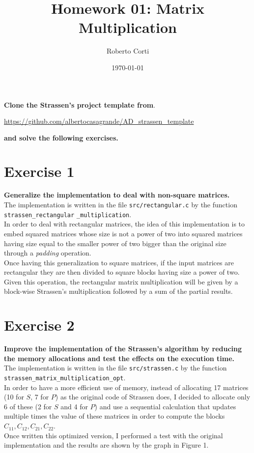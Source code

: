 \documentclass{article}
\title{Homework 01: Matrix Multiplication}
\date{\today}
\author{Roberto Corti}
\begin{document}
	\maketitle
	
	
	\noindent \textbf{Clone the Strassen’s project template from}. 
	\begin{center}
		\url{https://github.com/albertocasagrande/AD_strassen_template} 	
	\end{center}
	\textbf{and solve the following exercises.}
	
	
	\section*{Exercise 1}
	\textbf{Generalize the implementation to deal with non-square matrices.}\\
	
	\noindent The implementation is written in the file \texttt{src/rectangular.c} by the function \texttt{strassen\_rectangular} \texttt{\_multiplication}.
	\\
	
	\noindent In order to deal with rectangular matrices, the idea of this implementation is to embed squared matrices whose size is not a power of two into squared matrices having size equal to the smaller power of two bigger than the original size through a \textit{padding} operation.\\
	Once having this generalization to square matrices, if the input matrices are rectangular they are then divided to square blocks having size a power of two. Given this operation, the rectangular matrix multiplication will be given by a block-wise Strassen's multiplication followed by a sum of the partial results.
	
	\section*{Exercise 2}
	\textbf{Improve the implementation of the Strassen’s algorithm by reducing the memory allocations and test the effects on the execution time.}\\
	
	\noindent The implementation is written in the file \texttt{src/strassen.c} by the function \texttt{strassen\_matrix\_multiplication\_opt}.
	\\
	
	\noindent In order to have a more efficient use of memory, instead of allocating 17 matrices (10 for $S$, 7 for $P$) as the original code of Strassen does, I decided to allocate only 6 of these (2 for $S$ and 4 for $P$) and use a sequential calculation that updates multiple times the value of these matrices in order to compute the blocks $C_{11}, C_{12}, C_{21}, C_{22}$. \\
	Once written this optimized version, I performed a test with the original implementation and the results are shown by the graph in Figure 1.
\end{document}
